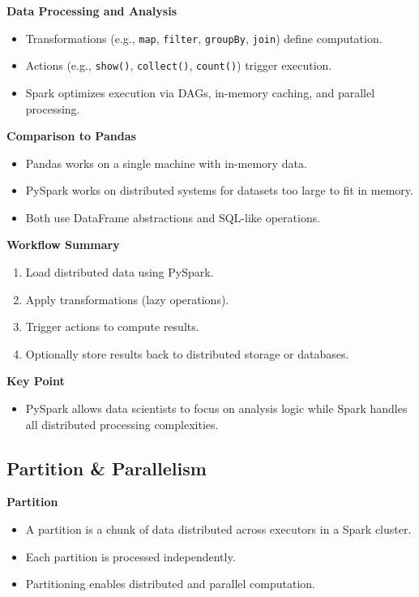 \documentclass[10pt,a4paper]{article}
\begin{document}
	\textbf{Data Processing and Analysis}
	\begin{itemize}
	    \item Transformations (e.g., \texttt{map}, \texttt{filter}, \texttt{groupBy}, \texttt{join}) define computation.
	    \item Actions (e.g., \texttt{show()}, \texttt{collect()}, \texttt{count()}) trigger execution.
	    \item Spark optimizes execution via DAGs, in-memory caching, and parallel processing.
	\end{itemize}
	
	\textbf{Comparison to Pandas}
	\begin{itemize}
	    \item Pandas works on a single machine with in-memory data.
	    \item PySpark works on distributed systems for datasets too large to fit in memory.
	    \item Both use DataFrame abstractions and SQL-like operations.
	\end{itemize}
	
	\textbf{Workflow Summary}
	\begin{enumerate}
	    \item Load distributed data using PySpark.
	    \item Apply transformations (lazy operations).
	    \item Trigger actions to compute results.
	    \item Optionally store results back to distributed storage or databases.
	\end{enumerate}
	
	\textbf{Key Point}
	\begin{itemize}
	    \item PySpark allows data scientists to focus on analysis logic while Spark handles all distributed processing complexities.
	\end{itemize}
	
	
	
	\subsection{Partition \& Parallelism}
	
	\textbf{Partition}
	\begin{itemize}
	    \item A partition is a chunk of data distributed across executors in a Spark cluster.
	    \item Each partition is processed independently.
	    \item Partitioning enables distributed and parallel computation.
	\end{itemize}
	
\end{document}

